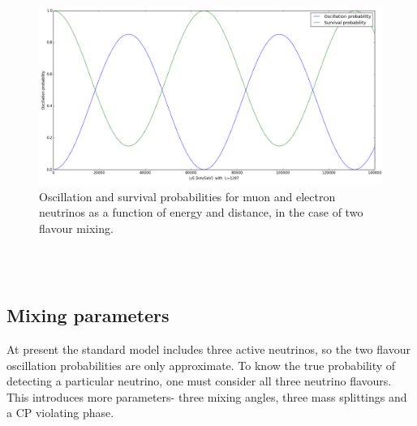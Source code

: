 \documentclass[12pt]{article}
\begin{document}
\begin{figure}[h!]
    \includegraphics[scale=0.4]{2_flavour_no_matter.png}
\caption{Oscillation and survival probabilities for muon and electron neutrinos as a function of energy and distance, in the case of two flavour mixing.}
\label{fig:oscillationandsurvival}
\end{figure}\\\\
\newpage
\subsection{Mixing parameters}
At present the standard model includes three active neutrinos, so the two flavour oscillation probabilities are only approximate. To know the true probability of detecting a particular neutrino, one must consider all three neutrino flavours. This introduces more parameters- three mixing angles, three mass splittings and a CP violating phase.\\\\
\end{document}
